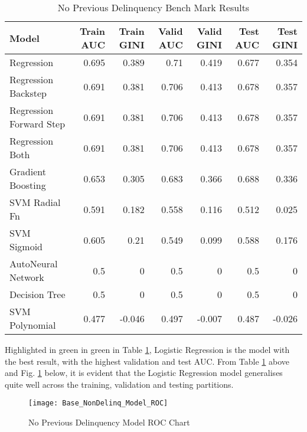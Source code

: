 \begin{table}[H]
	\centering
	\resizebox{\textwidth}{!}
	{
		\begin{tabular}{l | r | r| r |r| r|r}
			\hline
			\textbf{Model} & \textbf{Train AUC} & \textbf{Train GINI} & \textbf{Valid AUC} & \textbf{Valid GINI}& \textbf{Test AUC} & \textbf{Test GINI}\\
			\hline
			\cellcolor{green!25}Regression & \cellcolor{green!25}0.695 & \cellcolor{green!25}0.389 & \cellcolor{green!25}0.71 & \cellcolor{green!25}0.419 & \cellcolor{green!25}0.677 & \cellcolor{green!25}0.354 \\
			Regression Backstep & 0.691 & 0.381 & 0.706 & 0.413 & 0.678 & 0.357 \\
			Regression Forward Step & 0.691 & 0.381 & 0.706 & 0.413 & 0.678 & 0.357 \\
			Regression Both & 0.691 & 0.381 & 0.706 & 0.413 & 0.678 & 0.357 \\
			Gradient Boosting & 0.653 & 0.305 & 0.683 & 0.366 & 0.688 & 0.336 \\
			SVM Radial Fn & 0.591 & 0.182 & 0.558 & 0.116 & 0.512 & 0.025 \\
			SVM Sigmoid & 0.605 & 0.21 & 0.549 & 0.099 & 0.588 & 0.176 \\
			AutoNeural Network & 0.5 & 0 & 0.5 & 0 & 0.5 & 0 \\
			Decision Tree & 0.5 & 0 & 0.5 & 0 & 0.5 & 0 \\
			SVM Polynomial & 0.477 & -0.046 & 0.497 & -0.007 & 0.487 & -0.026 \\
			\hline
		\end{tabular}
	}
	\caption{No Previous Delinquency Bench Mark Results}
	\label{table:NoPreviousDelinquencyBaseModelDetails}
\end{table}

Highlighted in green in green in Table \ref{table:NoPreviousDelinquencyBaseModelDetails}, Logistic Regression is the model with the best result, with the highest validation and test AUC. From Table \ref{table:NoPreviousDelinquencyBaseModelDetails} above and Fig. \ref{fig:NonDelinq_Model_ROC} below, it is evident that the Logistic Regression model generalises quite well across the training, validation and testing partitions.

\begin{figure}[H]
	\texttt{[image: Base\_NonDelinq\_Model\_ROC]}
	\caption{No Previous Delinquency Model ROC Chart}
	\label{fig:NonDelinq_Model_ROC}
\end{figure}

